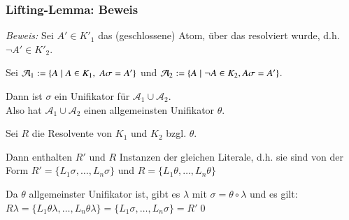 \documentclass[aspectratio=1610,onlymath]{beamer}
\begin{document}
\begin{frame}\frametitle{Lifting-Lemma: Beweis}


\emph{Beweis:} Sei $A'\in K'_1$ das (geschlossene) Atom, über das resolviert wurde, d.h. $\neg A'\in K'_2$.\smallskip\pause

Sei $\mathcal{A}_1\mathrel{:=}\{A\mid A\in K_1,\;A\sigma=A'\}$ und $\mathcal{A}_2\mathrel{:=}\{A\mid \neg A\in K_2, A\sigma=A'\}$.\smallskip\pause

Dann ist $\sigma$ ein Unifikator für $\mathcal{A}_1\cup\mathcal{A}_2$.\\ Also hat $\mathcal{A}_1\cup\mathcal{A}_2$ einen allgemeinsten Unifikator $\theta$.\smallskip\pause

Sei $R$ die Resolvente von $K_1$ und $K_2$ bzgl. $\theta$.\smallskip\pause

Dann enthalten $R'$ und $R$ Instanzen der gleichen Literale, d.h. sie sind von der Form
$R'=\{L_1\sigma,\ldots,L_n\sigma\}$ und $R=\{L_1\theta,\ldots,L_n\theta\}$\smallskip\pause

Da $\theta$ allgemeinster Unifikator ist, gibt es $\lambda$ mit $\sigma=\theta\circ\lambda$
und es gilt: $R\lambda=\{L_1\theta\lambda,\ldots,L_n\theta\lambda\}=\{L_1\sigma,\ldots,L_n\sigma\}=R'$\qed


\end{frame}
\end{document}
